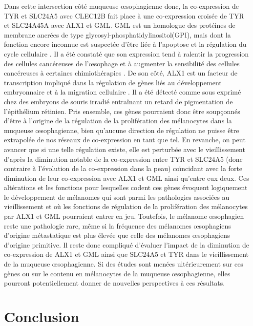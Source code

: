 Dans cette intersection côté muqueuse œsophagienne donc, la co-expression de TYR et SLC24A5 avec CLEC12B fait place à une co-expression croisée de TYR et SLC24A45A avec ALX1 et GML. 
GML est un homologue des protéines de membrane ancrées de type glycosyl-phosphatidylinositol(GPI), mais dont la fonction encore inconnue est suspectée d'être liée à l'apoptose et la régulation du cycle cellulaire . Il a été constaté que son expression tend à ralentir la progression des cellules cancéreuses de l'œsophage et à augmenter la sensibilité des cellules cancéreuses à certaines chimiothérapies . 
De son côté, ALX1 est un facteur de transcription impliqué dans la régulation de gènes liés au développement embryonnaire et à la migration cellulaire . Il a été détecté comme sous exprimé chez des embryons de souris irradié entraînant un retard de pigmentation de l'épithélium rétinien. 
Pris ensemble, ces gènes pourraient donc être soupçonnés d'être à l'origine de la régulation de la prolifération des mélanocytes dans la muqueuse œsophagienne, bien qu'aucune direction de régulation ne puisse être extrapolée de nos réseaux de co-expression en tant que tel. En revanche, on peut avancer que si une telle régulation existe, elle est perturbée avec le vieillissement d'après la diminution notable de la co-expression entre TYR et SLC24A5 (donc contraire à l'évolution de la co-expression dans la peau) coïncidant avec la forte diminution de leur co-expression avec ALX1 et GML ainsi qu'entre eux deux. 
Ces altérations et les fonctions pour lesquelles codent ces gènes évoquent logiquement le développement de mélanomes qui sont parmi les pathologies associées au vieillissement et où les fonctions de régulation de la prolifération des mélanocytes par ALX1 et GML pourraient entrer en jeu. Toutefois, le mélanome œsophagien reste une pathologie rare, même si la fréquence des mélanomes œsophagiens d'origine métastatique est plus élevée que celle des mélanomes œsophagiens d'origine primitive. Il reste donc compliqué d'évaluer l'impact de la diminution de co-expression de ALX1 et GML ainsi que SLC24A5 et TYR dans le vieillissement de la muqueuse œsophagienne. Si des études sont menées ultérieurement sur ces gènes ou sur le contenu en mélanocytes de la muqueuse œsophagienne, elles pourront potentiellement donner de nouvelles perspectives à ces résultats.





\section{Conclusion}

